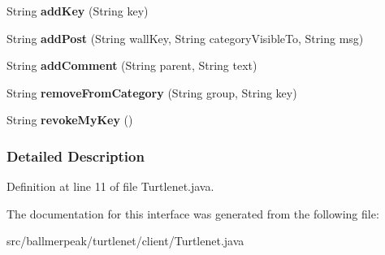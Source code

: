 \begin{DoxyCompactItemize}
\item 
\hypertarget{interfaceballmerpeak_1_1turtlenet_1_1client_1_1Turtlenet_aefdafb728b08fcd230ed1ca26bf4ce9f}{String {\bfseries add\-Key} (String key)}\label{interfaceballmerpeak_1_1turtlenet_1_1client_1_1Turtlenet_aefdafb728b08fcd230ed1ca26bf4ce9f}

\item 
\hypertarget{interfaceballmerpeak_1_1turtlenet_1_1client_1_1Turtlenet_a820a403aab7aeaa167cfef0f9a57c47e}{String {\bfseries add\-Post} (String wall\-Key, String category\-Visible\-To, String msg)}\label{interfaceballmerpeak_1_1turtlenet_1_1client_1_1Turtlenet_a820a403aab7aeaa167cfef0f9a57c47e}

\item 
\hypertarget{interfaceballmerpeak_1_1turtlenet_1_1client_1_1Turtlenet_a5b9f57137f7abaca7713840d42918434}{String {\bfseries add\-Comment} (String parent, String text)}\label{interfaceballmerpeak_1_1turtlenet_1_1client_1_1Turtlenet_a5b9f57137f7abaca7713840d42918434}

\item 
\hypertarget{interfaceballmerpeak_1_1turtlenet_1_1client_1_1Turtlenet_a3428354990f73f31969b9965ac84f279}{String {\bfseries remove\-From\-Category} (String group, String key)}\label{interfaceballmerpeak_1_1turtlenet_1_1client_1_1Turtlenet_a3428354990f73f31969b9965ac84f279}

\item 
\hypertarget{interfaceballmerpeak_1_1turtlenet_1_1client_1_1Turtlenet_a8630df1f1be5f09e7a258d2f8ab00feb}{String {\bfseries revoke\-My\-Key} ()}\label{interfaceballmerpeak_1_1turtlenet_1_1client_1_1Turtlenet_a8630df1f1be5f09e7a258d2f8ab00feb}

\end{DoxyCompactItemize}


\subsubsection{Detailed Description}


Definition at line 11 of file Turtlenet.\-java.



The documentation for this interface was generated from the following file\-:\begin{DoxyCompactItemize}
\item 
src/ballmerpeak/turtlenet/client/Turtlenet.\-java\end{DoxyCompactItemize}
